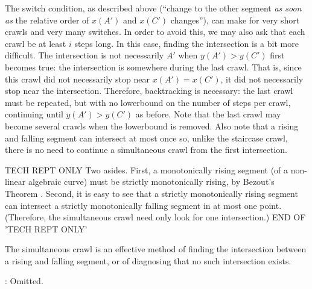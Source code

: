 The switch condition, as described above
(``change to the other segment {\em as soon as} 
the relative order of $x(A')$ and $x(C')$ changes''),
can make for very short crawls and very many switches.
In order to avoid this, we may also ask that each crawl 
be at least $i$ steps long.
In this case, finding the intersection is a bit more difficult.
The intersection is not necessarily $A'$ 
when $y(A') > y(C')$ first becomes true:
the intersection is somewhere during the last crawl.
That is, since this
crawl did not necessarily stop near $x(A') = x(C')$, it did not necessarily
stop near the intersection.
Therefore, backtracking is necessary: the last crawl must be repeated, but 
with no lowerbound on the number of steps per crawl, continuing until 
$y(A') > y(C')$ as before.
Note that the 
last crawl may become several crawls when the lowerbound is removed.
Also note that a rising and falling segment can intersect at most once so,
unlike the staircase crawl,
there is no need to continue a simultaneous crawl from the first intersection.

\ifFull
TECH REPT ONLY
Two asides.
First, a monotonically rising segment (of a non-linear algebraic curve) must
be strictly monotonically rising, by Bezout's Theorem \cite{walker}.
Second, it is easy to see that a strictly monotonically rising segment can
intersect a strictly monotonically falling segment in at most one point.
(Therefore, the simultaneous crawl need only look for one intersection.)
END OF 'TECH REPT ONLY'
\fi



\begin{lemma}
The simultaneous crawl is an effective method of finding the intersection
between a rising and falling segment, or of diagnosing that no such
intersection exists.
\end{lemma}
: Omitted. \QED

